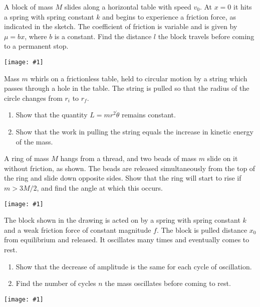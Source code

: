 \documentclass[12pt,letterpaper]{hmcpset}
\newcommand{\diagram}[1]{\begin{center} \texttt{[image: \#1]} \end{center}}
\begin{document}

\begin{problem}
    A block of mass $M$ slides along a 
    horizontal table with speed $v_{0}$. At $x
    = 0$ it hits a spring with spring constant
    $k$ and begins to experience a friction 
    force, as indicated in the sketch. The
    coefficient of friction is variable and 
    is given by $\mu = b x$, where $b$ is a 
    constant. Find the distance $l$ the block 
    travels before coming to a permanent stop.
    \diagram{img/5_2.png}
\end{problem}

\begin{solution}
    \vfill
\end{solution}
\newpage

\begin{problem}
    Mass $m$ whirls on a frictionless table,
    held to circular motion by a string
    which passes through a hole in the table.
    The string is pulled so that the
    radius of the circle changes from $r_i$ to $r_f$.
    \begin{enumerate}
    \item Show that the quantity $L = m r^2 \dot{\theta}$
        remains constant.
    \item Show that the work in pulling the
        string equals the increase in
        kinetic energy of the mass.
    \end{enumerate}
\end{problem}

\begin{solution}
    \vfill
\end{solution}
\newpage

\begin{problem}
  A ring of mass $M$ hangs from a thread, and two beads of mass $m$ slide on it
  without friction, as shown. The beads are released simultaneously from the top
  of the ring and slide down opposite sides. Show that the ring will start to
  rise if $m > 3M/2$, and find the angle at which this occurs.
  \diagram{img/5_7.png}
\end{problem}

\begin{solution}
    \vfill
\end{solution}
\newpage

\begin{problem}
  The block shown in the drawing is acted on by a spring with spring constant
  $k$ and a weak friction force of constant magnitude $f$. The block is pulled
  distance $x_{0}$ from equilibrium and released. It oscillates many times and
  eventually comes to rest.
  \begin{enumerate}
    \item Show that the decrease of amplitude is the same for each cycle of
      oscillation.
    \item Find the number of cycles $n$ the mass oscillates before coming to
      rest.
  \end{enumerate}
  \diagram{img/5_8.png}
\end{problem}
\end{document}
